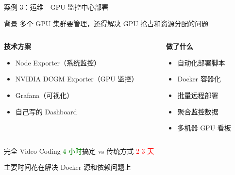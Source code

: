\documentclass[aspectratio=169,xcolor=dvipsnames]{beamer}
\begin{document}
\begin{frame}{案例 3：运维 - GPU 监控中心部署}
  \begin{block}{背景}
    多个 GPU 集群要管理，还得解决 GPU 抢占和资源分配的问题
  \end{block}

  \begin{columns}
    \begin{column}{0.48\textwidth}
      \textbf{技术方案}
      \begin{itemize}
        \item Node Exporter（系统监控）
        \item NVIDIA DCGM Exporter（GPU 监控）
        \item Grafana（可视化）
        \item 自己写的 Dashboard
      \end{itemize}
    \end{column}
    \begin{column}{0.48\textwidth}
      \textbf{做了什么}
      \begin{itemize}
        \item 自动化部署脚本
        \item Docker 容器化
        \item 批量远程部署
        \item 聚合监控数据
        \item 多机器 GPU 看板
      \end{itemize}
    \end{column}
  \end{columns}

  \vspace{0.3cm}

  \begin{exampleblock}{完全 Video Coding}
    \textcolor{green}{4 小时}搞定 vs 传统方式 \textcolor{red}{2-3 天}
  \end{exampleblock}

  \small{主要时间花在解决 Docker 源和依赖问题上}
\end{frame}
\end{document}
